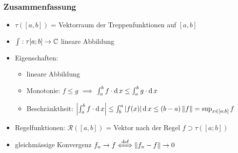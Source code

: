 \subsubsection{Zusammenfassung}
\begin{itemize}
  \item $\tau\left( [a,b] \right)$ = Vektorraum der Treppenfunktionen auf $[a,b]$
  \item $\int: \tau[a;b]\to\mathbb{C}$ lineare Abbildung
  \item Eigenschaften:
    \begin{itemize}
      \item lineare Abbildung
      \item Monotonie: $f\leq g$ $\implies$ $\int^b_af\cdot \operatorname{d} x\leq \int^b_ag\cdot \operatorname{d} x$
      \item Beschränktheit: $\left| \int^b_af\cdot \operatorname{d} x \right|\leq \int^a_b\left| f(x) \right|\operatorname{d} x\leq (b-a)\left\| f \right\| = \sup_{x\in[a;b]}f$
    \end{itemize}
  \item Regelfunktionen: $\mathcal{R}\left( [a,b] \right)$ = Vektor nach der Regel $f\supset\tau\left( [a;b] \right)$
  \item gleichmässige Konvergenz $f_n\to f\xLeftrightarrow{\text{def}}\Norm{f_n-f}\to 0$
\end{itemize}
